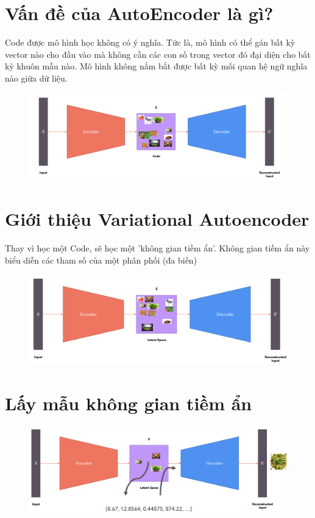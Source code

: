 \documentclass{book}
\begin{document}
\section{Vấn đề của AutoEncoder là gì?}
Code được mô hình học không có ý nghĩa. Tức là, mô hình có thể gán bất kỳ vector nào cho đầu vào mà không cần các con số trong vector đó đại diện cho bất kỳ khuôn mẫu nào. Mô hình không nắm bắt được bất kỳ mối quan hệ ngữ nghĩa nào giữa dữ liệu.

\begin{figure}[H]
    \centering
    \includegraphics[width=0.75\linewidth]{images/VAE_4.png}
\end{figure}

\section{Giới thiệu Variational Autoencoder}
Thay vì học một Code, sẽ học một 'không gian tiềm ẩn'. Không gian tiềm ẩn này biểu diễn các tham số của một phân phối (đa biến)

\begin{figure}[H]
    \centering
    \includegraphics[width=0.75\linewidth]{images/VAE_5.png}
\end{figure}

\section{Lấy mẫu không gian tiềm ẩn}

\begin{figure}[H]
    \centering
    \includegraphics[width=0.75\linewidth]{images/VAE_6.png}
\end{figure}
\end{document}
